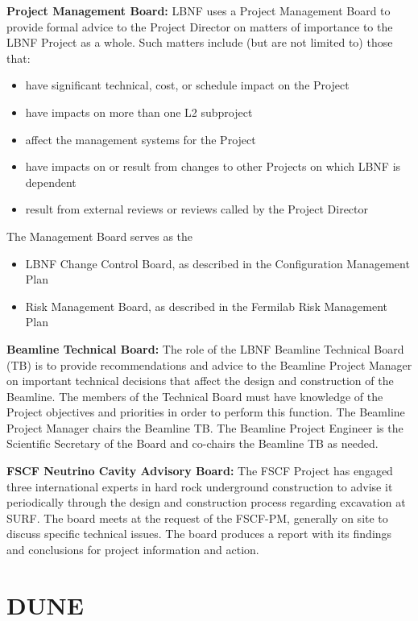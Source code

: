 \textbf{Project Management Board:} LBNF uses a Project Management Board to provide formal advice to the Project Director on matters of importance to the LBNF Project as a whole. Such matters include (but are not limited to) those that:
\begin{itemize}
\item have significant technical, cost, or schedule impact on the Project
\item have impacts on more than one L2 subproject
\item affect the management systems for the Project
\item have impacts on or result from changes to other Projects on which LBNF is dependent
\item result from external reviews or reviews called by the Project Director
\end{itemize}
The Management Board serves as the
\begin{itemize}
\item LBNF Change Control Board, as described in the Configuration Management Plan \fixme{[ref]}
\item Risk Management Board, as described in the Fermilab Risk Management Plan  \fixme{[ref]}
\end{itemize}

\textbf{Beamline Technical Board:} The role of the LBNF Beamline Technical Board (TB) is to provide recommendations and advice to the Beamline Project Manager on important technical decisions that affect the design and construction of the Beamline. The members of the Technical Board must have knowledge of the Project objectives and priorities in order to perform this function. The Beamline Project Manager chairs the Beamline TB. The Beamline Project Engineer is the Scientific Secretary of the Board and co-chairs the Beamline TB as needed. 

\textbf{FSCF Neutrino Cavity Advisory Board:} The FSCF Project has engaged three international experts in hard rock underground construction to advise it periodically through the design and construction process regarding excavation at SURF. The board meets at the request of the FSCF-PM, generally on site to discuss specific technical issues. The board produces a report with its findings and conclusions for project information and action. 

\section{DUNE}

